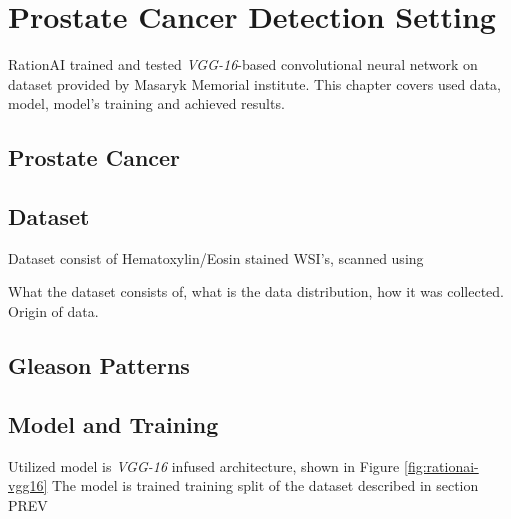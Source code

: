 \chapter{Prostate Cancer Detection Setting}

RationAI trained and tested \emph{VGG-16}-based convolutional neural network on dataset provided by Masaryk Memorial institute. This chapter covers used data, model, model's training and achieved results.

\section{Prostate Cancer}

\section{Dataset}

Dataset consist of Hematoxylin/Eosin stained WSI's, scanned using

What the dataset consists of, what is the data distribution, how it was collected. Origin of data.

\section{Gleason Patterns}

\section{Model and Training}

Utilized model is \emph{VGG-16} infused architecture, shown in Figure \ref{fig:rationai-vgg16} The model is trained training split of the dataset described in section PREV

